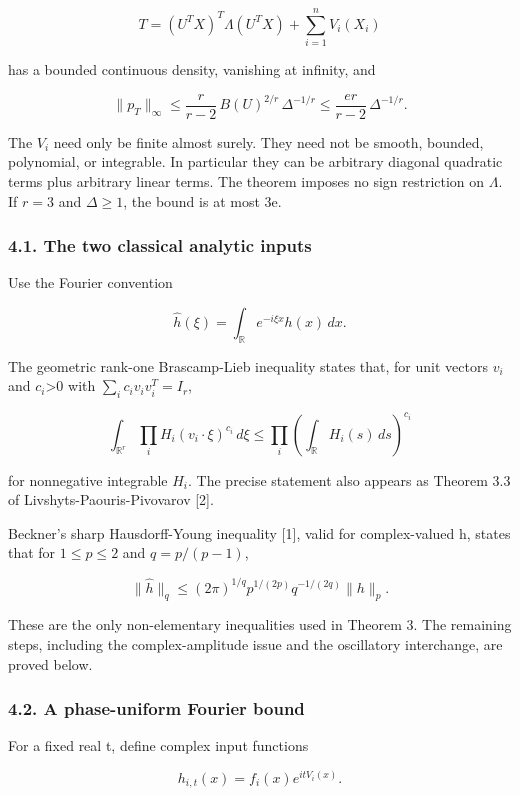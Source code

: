 \documentclass[
  11pt,
]{article}
\begin{document}
\[
T=(U^TX)^T\Lambda(U^TX)+\sum_{i=1}^n V_i(X_i)
\]

has a bounded continuous density, vanishing at infinity, and

\[
\boxed{\quad
\lVert p_T\rVert_\infty
\le \frac{r}{r-2}\,B(U)^{2/r}\,\Delta^{-1/r}
\le \frac{er}{r-2}\,\Delta^{-1/r}.
\quad}
\]

The \(V_i\) need only be finite almost surely. They need not be smooth,
bounded, polynomial, or integrable. In particular they can be arbitrary
diagonal quadratic terms plus arbitrary linear terms. The theorem
imposes no sign restriction on \(\Lambda\). If \(r=3\) and
\(\Delta\ge1\), the bound is at most 3e.

\subsubsection{4.1. The two classical analytic
inputs}\label{the-two-classical-analytic-inputs}

Use the Fourier convention

\[
\widehat h(\xi)=\int_{\mathbb R}e^{-i\xi x}h(x)\,dx.
\]

The geometric rank-one Brascamp-Lieb inequality states that, for unit
vectors \(v_i\) and \(c_i\)\textgreater0 with
\(\sum_i c_i v_i v_i^T=I_r\),

\[
\int_{\mathbb R^r}\prod_i H_i(v_i\cdot\xi)^{c_i}\,d\xi
\le\prod_i\left(\int_{\mathbb R}H_i(s)\,ds\right)^{c_i}
\]

for nonnegative integrable \(H_i\). The precise statement also appears
as Theorem 3.3 of Livshyts-Paouris-Pivovarov {[}2{]}.

Beckner's sharp Hausdorff-Young inequality {[}1{]}, valid for
complex-valued h, states that for \(1\le p\le2\) and \(q=p/(p-1)\),

\[
\lVert\widehat h\rVert_q\le
(2\pi)^{1/q}p^{1/(2p)}q^{-1/(2q)}\lVert h\rVert_p.
\]

These are the only non-elementary inequalities used in Theorem 3. The
remaining steps, including the complex-amplitude issue and the
oscillatory interchange, are proved below.

\subsubsection{4.2. A phase-uniform Fourier
bound}\label{a-phase-uniform-fourier-bound}

For a fixed real t, define complex input functions

\[
h_{i,t}(x)=f_i(x)e^{itV_i(x)}.
\]
\end{document}
